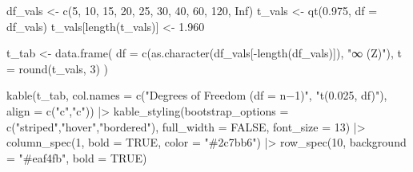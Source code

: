 \documentclass[
  12pt,
  letterpaper,
]{book}
\newenvironment{Shaded}{\begin{snugshade}}{\end{snugshade}}
\newcommand{\AttributeTok}[1]{\textcolor[rgb]{0.40,0.45,0.13}{#1}}
\newcommand{\ConstantTok}[1]{\textcolor[rgb]{0.56,0.35,0.01}{#1}}
\newcommand{\DecValTok}[1]{\textcolor[rgb]{0.68,0.00,0.00}{#1}}
\newcommand{\FloatTok}[1]{\textcolor[rgb]{0.68,0.00,0.00}{#1}}
\newcommand{\FunctionTok}[1]{\textcolor[rgb]{0.28,0.35,0.67}{#1}}
\newcommand{\NormalTok}[1]{\textcolor[rgb]{0.00,0.23,0.31}{#1}}
\newcommand{\OtherTok}[1]{\textcolor[rgb]{0.00,0.23,0.31}{#1}}
\newcommand{\SpecialCharTok}[1]{\textcolor[rgb]{0.37,0.37,0.37}{#1}}
\newcommand{\StringTok}[1]{\textcolor[rgb]{0.13,0.47,0.30}{#1}}
\begin{document}
\begin{Shaded}
\begin{Highlighting}[]
\NormalTok{df\_vals }\OtherTok{\textless{}{-}} \FunctionTok{c}\NormalTok{(}\DecValTok{5}\NormalTok{, }\DecValTok{10}\NormalTok{, }\DecValTok{15}\NormalTok{, }\DecValTok{20}\NormalTok{, }\DecValTok{25}\NormalTok{, }\DecValTok{30}\NormalTok{, }\DecValTok{40}\NormalTok{, }\DecValTok{60}\NormalTok{, }\DecValTok{120}\NormalTok{, }\ConstantTok{Inf}\NormalTok{)}
\NormalTok{t\_vals  }\OtherTok{\textless{}{-}} \FunctionTok{qt}\NormalTok{(}\FloatTok{0.975}\NormalTok{, }\AttributeTok{df =}\NormalTok{ df\_vals)}
\NormalTok{t\_vals[}\FunctionTok{length}\NormalTok{(t\_vals)] }\OtherTok{\textless{}{-}} \FloatTok{1.960}

\NormalTok{t\_tab }\OtherTok{\textless{}{-}} \FunctionTok{data.frame}\NormalTok{(}
  \AttributeTok{df =} \FunctionTok{c}\NormalTok{(}\FunctionTok{as.character}\NormalTok{(df\_vals[}\SpecialCharTok{{-}}\FunctionTok{length}\NormalTok{(df\_vals)]), }\StringTok{"∞ (Z)"}\NormalTok{),}
  \AttributeTok{t  =} \FunctionTok{round}\NormalTok{(t\_vals, }\DecValTok{3}\NormalTok{)}
\NormalTok{)}

\FunctionTok{kable}\NormalTok{(t\_tab, }\AttributeTok{col.names =} \FunctionTok{c}\NormalTok{(}\StringTok{"Degrees of Freedom (df = n−1)"}\NormalTok{, }\StringTok{"t(0.025, df)"}\NormalTok{),}
      \AttributeTok{align =} \FunctionTok{c}\NormalTok{(}\StringTok{"c"}\NormalTok{,}\StringTok{"c"}\NormalTok{)) }\SpecialCharTok{|\textgreater{}}
  \FunctionTok{kable\_styling}\NormalTok{(}\AttributeTok{bootstrap\_options =} \FunctionTok{c}\NormalTok{(}\StringTok{"striped"}\NormalTok{,}\StringTok{"hover"}\NormalTok{,}\StringTok{"bordered"}\NormalTok{),}
                \AttributeTok{full\_width =} \ConstantTok{FALSE}\NormalTok{, }\AttributeTok{font\_size =} \DecValTok{13}\NormalTok{) }\SpecialCharTok{|\textgreater{}}
  \FunctionTok{column\_spec}\NormalTok{(}\DecValTok{1}\NormalTok{, }\AttributeTok{bold =} \ConstantTok{TRUE}\NormalTok{, }\AttributeTok{color =} \StringTok{"\#2c7bb6"}\NormalTok{) }\SpecialCharTok{|\textgreater{}}
  \FunctionTok{row\_spec}\NormalTok{(}\DecValTok{10}\NormalTok{, }\AttributeTok{background =} \StringTok{"\#eaf4fb"}\NormalTok{, }\AttributeTok{bold =} \ConstantTok{TRUE}\NormalTok{)}
\end{Highlighting}
\end{Shaded}

\begingroup\fontsize{13}{15}\selectfont
\end{document}
